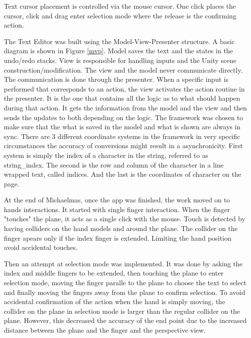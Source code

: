 \documentclass[a4paper, 12pt]{article}
\begin{document}
Text cursor placement is controlled via the mouse cursor. One click places the cursor, click and drag enter selection mode where the release is the confirming action.

The Text Editor was built using the Model-View-Presenter structure. A basic diagram is shown in Figure \ref{mvp}. Model saves the text and the states in the undo/redo stacks. View is responsible for handling inputs and the Unity scene construction/modification. The view and the model never communicate directly. The communication is done through the presenter. When a specific input is performed that corresponds to an action, the view activates the action routine in the presenter. It is the one that contains all the logic as to what should happen during that action. It gets the information from the model and the view and then sends the updates to both depending on the logic. The framework was chosen to make sure that the what is saved in the model and what is shown are always in sync. There are 3 different coordinate systems in the framework in very specific circumstances the accuracy of conversions might result in a asynchronicity. First system is simply the index of a character in the string, referred to as string\_index. The second is the row and column of the character in a line wrapped text, called indices. And the last is the coordinates of character on the page.


At the end of Michaelmas, once the app was finished, the work moved on to hands interactions. It started with single finger interaction. When the finger "touches" the plane, it acts as a single click with the mouse. Touch is detected by having colliders on the hand models and around the plane. The collider on the finger apears only if the index finger is extended. Limiting the hand position avoid accidental touches.

Then an attempt at selection mode was implemented. It was done by asking the index and middle fingers to be extended, then touching the plane to enter selection mode, moving the finger paralle to the plane to choose the text to select and finally moving the fingers away from the plane to confirm selection. To avoid accidental confirmation of the action when the hand is simply moving, the collider on the plane in selection mode is larger than the regular collider on the plane. However, this decreased the accuracy of the end point due to the increased distance between the plane and the finger and the perspective view. 
\end{document}
